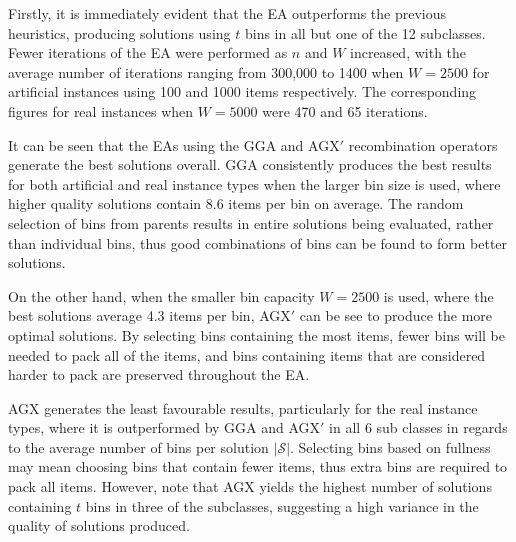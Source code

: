 \documentclass[authoryear]{elsarticle}
\begin{document}
Firstly, it is immediately evident that the EA outperforms the previous heuristics, producing solutions using $t$ bins in all but one of the 12 subclasses. Fewer iterations of the EA were performed as $n$ and $W$ increased, with the average number of iterations ranging from 300,000 to 1400 when $W=2500$ for artificial instances using 100 and 1000 items respectively. The corresponding figures for real instances when $W=5000$ were 470 and 65 iterations.

It can be seen that the EAs using the GGA and AGX$'$ recombination operators generate the best solutions overall. GGA consistently produces the best results for both artificial and real instance types when the larger bin size is used, where higher quality solutions contain 8.6 items per bin on average. The random selection of bins from parents results in entire solutions being evaluated, rather than individual bins, thus good combinations of bins can be found to form better solutions.

\noindent On the other hand, when the smaller bin capacity $W=2500$ is used, where the best solutions average 4.3 items per bin, AGX$'$ can be see to produce the more optimal solutions. By selecting bins containing the most items, fewer bins will be needed to pack all of the items, and bins containing items that are considered harder to pack are preserved throughout the EA. 

AGX generates the least favourable results, particularly for the real instance types, where it is outperformed by GGA and AGX$'$ in all 6 sub classes in regards to the average number of bins per solution $|\mathcal{S}|$. Selecting bins based on fullness may mean choosing bins that contain fewer items, thus extra bins are required to pack all items. However, note that AGX yields the highest number of solutions containing $t$ bins in three of the subclasses, suggesting a high variance in the quality of solutions produced.
\end{document}
